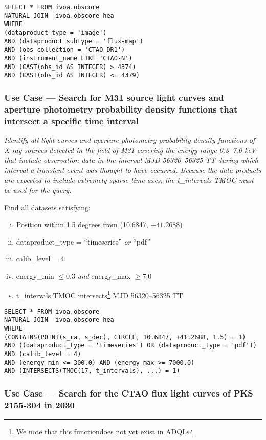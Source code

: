 \begin{verbatim}
SELECT * FROM ivoa.obscore
NATURAL JOIN  ivoa.obscore_hea
WHERE
(dataproduct_type = 'image')
AND (dataproduct_subtype = 'flux-map')
AND (obs_collection = 'CTAO-DR1')
AND (instrument_name LIKE 'CTAO-N')
AND (CAST(obs_id AS INTEGER) > 4374)
AND (CAST(obs_id AS INTEGER) <= 4379)
\end{verbatim}


\subsubsection{Use Case --- Search for M31 source light curves and aperture photometry probability density functions that intersect a specific time interval}

{\em Identify all light curves and aperture photometry probability density functions of X-ray sources detected in the field of M31 covering the energy range 0.3--7.0 keV that include observation data in the interval MJD 56320--56325 TT during which interval a transient event was thought to have occurred.  Because the data products are expected to include extremely sparse time axes, the t\_intervals TMOC must be used for the query.\/}

\medskip
\noindent Find all datasets satisfying:
\begin{enumerate}[(i)]
  \item Position within 1.5 degrees from (10.6847, $+41.2688$)
  \item dataproduct\_type = ``timeseries'' {\em or\/} ``pdf''
  \item calib\_level = 4
  \item energy\_min $\leq 0.3$ {\em and\/} energy\_max $\geq 7.0$
  \item t\_intervals TMOC intersects\footnote{We note that this functiondoes not yet exist in \gls{ADQL}} MJD 56320--56325 TT
\end{enumerate}


\begin{verbatim}
SELECT * FROM ivoa.obscore
NATURAL JOIN  ivoa.obscore_hea
WHERE
(CONTAINS(POINT(s_ra, s_dec), CIRCLE, 10.6847, +41.2688, 1.5) = 1)
AND ((dataproduct_type = 'timeseries') OR (dataproduct_type = 'pdf'))
AND (calib_level = 4)
AND (energy_min <= 300.0) AND (energy_max >= 7000.0)
AND (INTERSECTS(TMOC(17, t_intervals), ...) = 1)
\end{verbatim}

\subsubsection{Use Case --- Search for the CTAO flux light curves of PKS 2155-304 in 2030}

